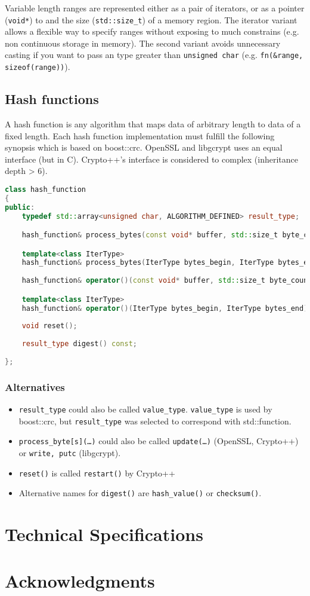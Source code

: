 \documentclass[10pt,letterpaper]{article}
\begin{document}
Variable length ranges are represented either as a pair of iterators, or as a pointer (\texttt{void*}) to and the size (\texttt{std::size\_t}) of a memory region. The iterator variant allows a flexible way to specify ranges without exposing to much constrains (e.g. non continuous storage in memory). The second variant avoids unnecessary casting if you want to pass an type greater than \texttt{unsigned char} (e.g. \texttt{fn(\&range, sizeof(range))}).

\subsection{Hash functions}
A hash function is any algorithm that maps data of arbitrary length to data of a fixed length. %
Each hash function implementation must fulfill the following synopsis which is based on boost::crc. OpenSSL and libgcrypt uses an equal interface (but in C). Crypto++'s interface is considered to complex (inheritance depth > 6).
\begin{lstlisting}[language=C++]
class hash_function
{
public:
	typedef std::array<unsigned char, ALGORITHM_DEFINED> result_type;

	hash_function& process_bytes(const void* buffer, std::size_t byte_count);

	template<class IterType>
	hash_function& process_bytes(IterType bytes_begin, IterType bytes_end);
	
	hash_function& operator()(const void* buffer, std::size_t byte_count);

	template<class IterType>
	hash_function& operator()(IterType bytes_begin, IterType bytes_end);
	
	void reset();
	
	result_type digest() const;
	
};
\end{lstlisting}
\subsubsection*{Alternatives}
\begin{itemize}
\item \texttt{result\_type} could also be called \texttt{value\_type}. \texttt{value\_type} is used by boost::crc, but \texttt{result\_type} was selected to correspond with std::function.

\item \texttt{process\_byte[s](\dots)} could also be called \texttt{update(\dots)} (OpenSSL, Crypto++) or \texttt{write, putc} (libgcrypt).

\item \texttt{reset()} is called \texttt{restart()} by Crypto++

\item Alternative names for \texttt{digest()} are \texttt{hash\_value()} or \texttt{checksum()}.
\end{itemize}

\section{Technical Specifications}

\section{Acknowledgments}
\end{document}
